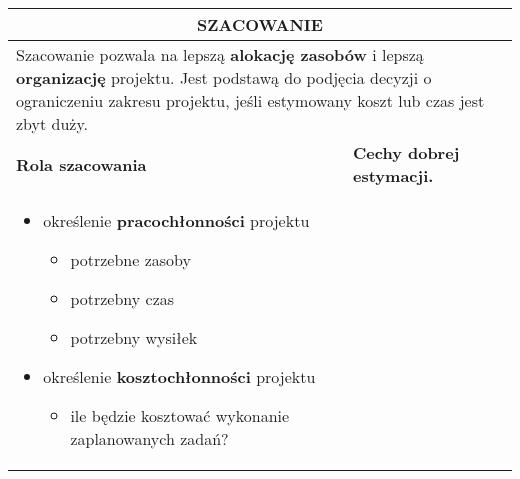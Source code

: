 \documentclass[../main.tex]{subfiles}
\begin{document}
    \begin{table}[H]
        \begin{center}
            \begin{tabular}{| p{8cm} | p{8cm} |}
                \hline
                \multicolumn{2}{|c|}{\textbf{SZACOWANIE}}\\
                \hline
                \hline
                \multicolumn{2}{|p{16cm}|}{ Szacowanie pozwala na lepszą \textbf{alokację zasobów} i lepszą \textbf{organizację} projektu. Jest podstawą do podjęcia
                decyzji o ograniczeniu zakresu projektu, jeśli estymowany koszt lub czas jest zbyt duży.
                }\\
                \hline
                \hline
                \textbf{Rola szacowania} & \textbf{Cechy dobrej estymacji.}\\
                \hline
                \begin{itemize}
                    \item określenie \textbf{pracochłonności} projektu
                    \begin{itemize}
                        \item potrzebne zasoby
                        \item potrzebny czas
                        \item potrzebny wysiłek
                    \end{itemize}
                    \item określenie \textbf{kosztochłonności} projektu
                    \begin{itemize}
                        \item ile będzie kosztować wykonanie zaplanowanych zadań?
                    \end{itemize}
                \end{itemize}


\end{tabular}
\end{center}
\end{table}
\end{document}
